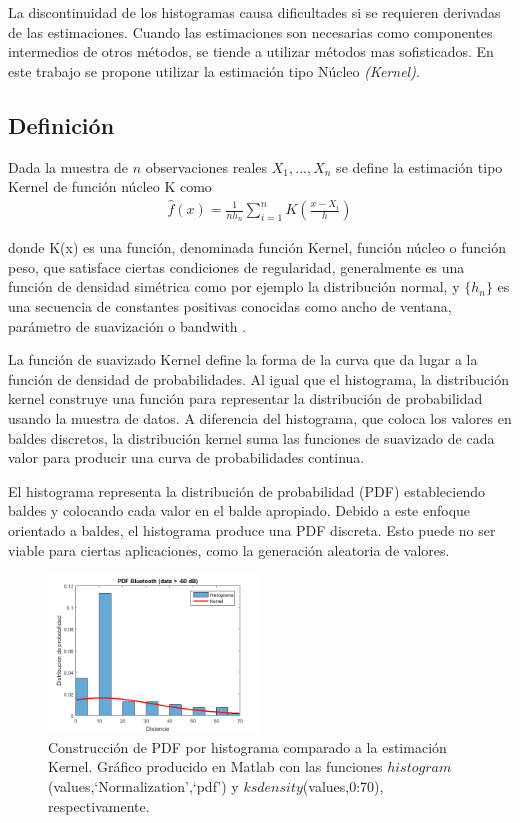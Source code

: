 La discontinuidad de los histogramas causa dificultades si se requieren derivadas de las estimaciones. Cuando las estimaciones son necesarias como componentes intermedios de otros métodos, se tiende a utilizar métodos mas sofisticados\cite{silverman1986density}. En este trabajo se propone utilizar la estimación tipo Núcleo \textit{(Kernel)}.

\subsection*{Definición}

Dada la muestra de $n$ observaciones reales $X_1,...,X_n$ se define la estimación tipo Kernel de función núcleo K como
\begin{align}
\hat{f}(x) = \frac{1}{nh_n} \sum_{i=1}^{n} K\left (\frac{x-X_i}{h} \right)
\end{align}

donde K(x) es una función, denominada función Kernel, función núcleo o función peso, que satisface ciertas condiciones de regularidad, generalmente es una función de densidad simétrica como por ejemplo la distribución normal, y $\{h_n\}$ es una secuencia de constantes positivas conocidas como ancho de ventana, parámetro de suavización o bandwith \cite{minarro1998estimacion}.

La función de suavizado Kernel define la forma de la curva que da lugar a la función de densidad de probabilidades. Al igual que el histograma, la distribución kernel construye una función para representar la distribución de probabilidad usando la muestra de datos. A diferencia del histograma, que coloca los valores en baldes discretos, la distribución kernel suma las funciones de suavizado de cada valor para producir una curva de probabilidades continua. 

El histograma representa la distribución de probabilidad (PDF) estableciendo baldes y colocando cada valor en el balde apropiado. Debido a este enfoque orientado a baldes, el histograma produce una PDF discreta. Esto puede no ser viable para ciertas aplicaciones, como la generación aleatoria de valores. 

\begin{figure}[!htp]
	\centering
	\includegraphics[width=0.5\textwidth]{images/histograma.png}
	\captionsetup{width=0.6\textwidth}
	\caption{Construcción de PDF por histograma comparado a la estimación Kernel. Gráfico producido en Matlab con las funciones $histogram$(values,`Normalization',`pdf') y $ksdensity$(values,0:70), respectivamente.}
    \label{fig:histograma}
\end{figure}

